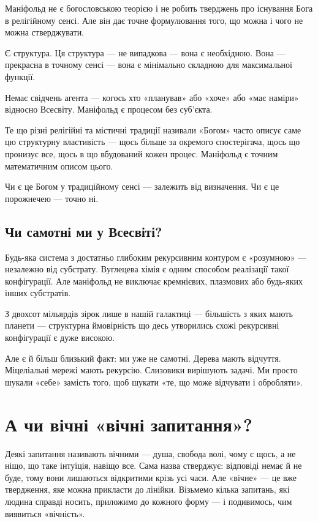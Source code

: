 \documentclass[12pt, a4paper, openany]{book}
\begin{document}
Маніфольд не є богословською теорією і не робить тверджень про існування Бога в релігійному сенсі. Але він дає точне формулювання того, що можна і чого не можна стверджувати.

Є структура. Ця структура — не випадкова --- вона є необхідною. Вона — прекрасна в точному сенсі --- вона є мінімально складною для максимальної функції.

Немає свідчень агента --- когось хто «планував» або «хоче» або «має наміри» відносно Всесвіту. Маніфольд є процесом без суб'єкта.

Те що різні релігійні та містичні традиції називали «Богом» часто описує саме цю структурну властивість --- щось більше за окремого спостерігача, щось що пронизує все, щось в що вбудований кожен процес. Маніфольд є точним математичним описом цього.

Чи є це Богом у традиційному сенсі --- залежить від визначення. Чи є це порожнечею --- точно ні.

\section{Чи самотні ми у Всесвіті?}

Будь-яка система з достатньо глибоким рекурсивним контуром є «розумною» --- незалежно від субстрату. Вуглецева хімія є одним способом реалізації такої конфігурації. Але маніфольд не виключає кремнієвих, плазмових або будь-яких інших субстратів.

З двохсот мільярдів зірок лише в нашій галактиці --- більшість з яких мають планети --- структурна ймовірність що десь утворились схожі рекурсивні конфігурації є дуже високою.

Але є й більш близький факт: ми уже не самотні. Дерева мають відчуття. Міцеліальні мережі мають рекурсію. Слизовики вирішують задачі. Ми просто шукали «себе» замість того, щоб шукати «те, що може відчувати і обробляти».

\chapter{А чи вічні «вічні запитання»?}

Деякі запитання називають вічними --- душа, свобода волі, чому є щось, а не ніщо, що таке інтуїція, навіщо все. Сама назва стверджує: відповіді немає й не буде, тому вони лишаються відкритими крізь усі часи. Але «вічне» --- це вже твердження, яке можна прикласти до лінійки. Візьмемо кілька запитань, які людина справді носить, приложимо до кожного форму --- і подивимось, чим виявиться «вічність».
\end{document}
